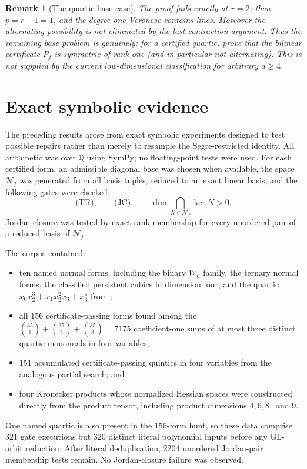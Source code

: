 \documentclass[11pt]{amsart}
\newtheorem{remark}[theorem]{Remark}
\newcommand{\Nsp}{\mathcal N}
\begin{document}
\begin{remark}[The quartic base case]
The proof fails exactly at $r=2$: then $p=r-1=1$, and the degree-one Veronese
contains lines.  Moreover the alternating possibility is not eliminated by the
last contraction argument.  Thus the remaining base problem is genuinely:
for a certified quartic, prove that the bilinear certificate $P_f$ is symmetric
of rank one (and in particular not alternating).  This is not supplied by the
current low-dimensional classification for arbitrary $d\ge4$.
\end{remark}

\section{Exact symbolic evidence}\label{sec:computations}

The preceding results arose from exact symbolic experiments designed to test
possible repairs rather than merely to resample the Segre-restricted identity.
All arithmetic was over $\mathbb Q$ using SymPy; no floating-point tests were
used.  For each certified form, an admissible diagonal base was chosen when
available, the space $\Nsp_f$ was generated from all basis tuples, reduced to an
exact linear basis, and the following gates were checked:
\[
 \text{(TR)},\qquad
 \text{(JC)},\qquad
 \dim\bigcap_{N\in\Nsp_f}\ker N>0.
\]
Jordan closure was tested by exact rank membership for every unordered pair of
a reduced basis of $\Nsp_f$.

The corpus contained:
\begin{itemize}[leftmargin=2em]
\item ten named normal forms, including the binary $W_n$ family, the ternary
      normal forms, the classified persistent cubics in dimension four, and the
      quartic $x_0x_2^3+x_1x_2^2x_3+x_3^4$ from \cite[Example~28]{GO25};
\item all 156 certificate-passing forms found among the
      $\binom{35}{1}+\binom{35}{2}+\binom{35}{3}=7175$ coefficient-one sums of
      at most three distinct quartic monomials in four variables;
\item 151 accumulated certificate-passing quintics in four variables from the
      analogous partial search; and
\item four Kronecker products whose normalized Hessian spaces were constructed
      directly from the product tensor, including product dimensions
      $4,6,8,$ and $9$.
\end{itemize}
One named quartic is also present in the 156-form hunt, so these data comprise
321 gate executions but 320 distinct literal polynomial inputs before any
$\mathrm{GL}$-orbit reduction.  After literal deduplication, 2204 unordered
Jordan-pair membership tests remain.  No Jordan-closure failure was observed.
\end{document}
